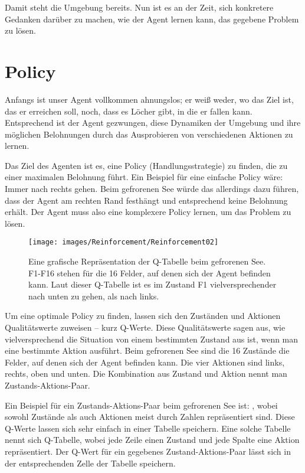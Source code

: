 \medskip

Damit steht die Umgebung bereits. Nun ist es an der Zeit, sich konkretere Gedanken darüber zu machen, wie der Agent lernen kann, das gegebene Problem zu lösen.

\section{Policy}

Anfangs ist unser Agent vollkommen ahnungslos; er weiß weder, wo das Ziel ist, das er erreichen soll, noch, dass es Löcher gibt, in die er fallen kann. Entsprechend ist der Agent gezwungen, diese Dynamiken der Umgebung und ihre möglichen Belohnungen durch das Ausprobieren von verschiedenen Aktionen zu lernen.

Das Ziel des Agenten ist es, eine Policy (Handlungsstrategie) zu finden, die zu einer maximalen Belohnung führt. Ein Beispiel für eine einfache Policy wäre: Immer nach rechts gehen. Beim gefrorenen See würde das allerdings dazu führen, dass der Agent am rechten Rand festhängt und entsprechend keine Belohnung erhält. Der Agent muss also eine komplexere Policy lernen, um das Problem zu lösen.

\begin{figure}
  \texttt{[image: images/Reinforcement/Reinforcement02]}
  \caption{Eine grafische Repräsentation der Q-Tabelle beim gefrorenen See. F1-F16 stehen für die 16 Felder, auf denen sich der Agent befinden kann. Laut dieser Q-Tabelle ist es im Zustand F1 vielversprechender nach unten zu gehen, als nach links.}\label{Reinforcement02}
\end{figure}


Um eine optimale Policy zu finden, lassen sich den Zuständen und Aktionen Qualitätswerte zuweisen -- kurz Q-Werte. Diese Qualitätswerte sagen aus, wie vielversprechend die Situation von einem bestimmten Zustand aus ist, wenn man eine bestimmte Aktion ausführt. Beim gefrorenen See sind die 16 Zustände die Felder, auf denen sich der Agent befinden kann. Die vier Aktionen sind links, rechts, oben und unten. Die Kombination aus Zustand und Aktion nennt man Zustands-Aktions-Paar.

Ein Beispiel für ein Zustands-Aktions-Paar beim gefrorenen See ist: , wobei sowohl Zustände als auch Aktionen meist durch Zahlen repräsentiert sind. Diese Q-Werte lassen sich sehr einfach in einer Tabelle speichern. Eine solche Tabelle nennt sich Q-Tabelle, wobei jede Zeile einen Zustand und jede Spalte eine Aktion repräsentiert. Der Q-Wert für ein gegebenes Zustand-Aktions-Paar lässt sich in der entsprechenden Zelle der Tabelle speichern.

